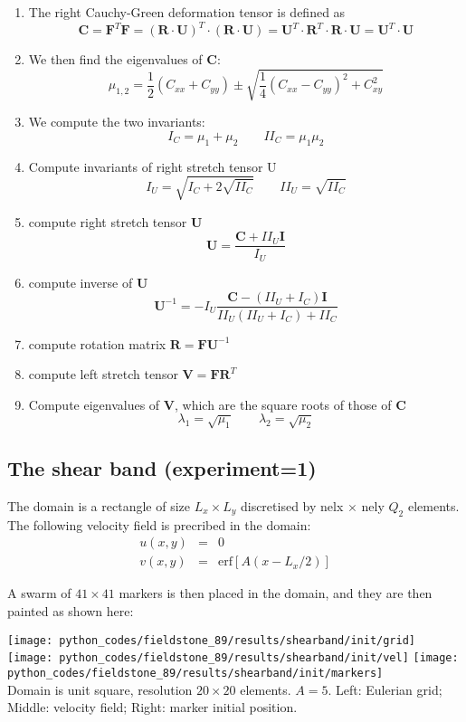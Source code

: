 \begin{enumerate}
\item The right Cauchy-Green deformation tensor is defined as
\[
{\bm C} = {\bm F}^T {\bm F}
= ({\bm R}\cdot {\bm U})^T \cdot ({\bm R} \cdot {\bm U})
= {\bm U}^T \cdot {\bm R}^T \cdot {\bm R} \cdot {\bm U}
= {\bm U}^T \cdot {\bm U}
\]
\item 
We then find the eigenvalues of ${\bm C}$:
\[
\mu_{1,2} = \frac{1}{2}(C_{xx}+C_{yy}) \pm \sqrt{ \frac{1}{4}(C_{xx}-C_{yy})^2 + C_{xy}^2   }
\]
\item We compute the two invariants:
\[
I_C = \mu_1+\mu_2 \qquad II_C = \mu_1\mu_2 
\]
\item Compute invariants of right stretch tensor U
\[
I_U=\sqrt{I_C+2\sqrt{II_C}}
\qquad
II_U=\sqrt{II_C}
\]
\item compute right stretch tensor ${\bm U}$
\[
{\bm U} = \frac{{\bm C}+ II_U {\bm I}}{I_U}
\]
\item compute inverse of ${\bm U}$
\[
{\bm U}^{-1} = - I_U \frac{{\bm C}- (II_U+I_C){\bm I}}{II_U(II_U+I_C)+II_C}
\]
\item compute rotation matrix ${\bm R}={\bm F}{\bm U}^{-1}$

\item compute left stretch tensor ${\bm V}={\bm F}{\bm R}^T$

\item Compute eigenvalues of ${\bm V}$, which are the square roots of those of ${\bm C}$
\[
\lambda_1 = \sqrt{\mu_1}
\qquad
\lambda_2 = \sqrt{\mu_2}
\]

\end{enumerate}










\newpage
\subsection*{The shear band (experiment=1)}

The domain is a rectangle of size $L_x\times L_y$ discretised by nelx $\times$ nely $Q_2$ elements.
The following velocity field is precribed in the domain:
\begin{eqnarray}
u(x,y)&=&0 \\
v(x,y)&=&\text{erf} [A(x-L_x/2)]
\end{eqnarray}

A swarm of $41\times41$ markers is then placed in the domain, 
and they are then painted as shown here:
\begin{center}
\texttt{[image: python\_codes/fieldstone\_89/results/shearband/init/grid]}
\texttt{[image: python\_codes/fieldstone\_89/results/shearband/init/vel]}
\texttt{[image: python\_codes/fieldstone\_89/results/shearband/init/markers]}\\
{\captionfont Domain is unit square, resolution $20\times20$ elements. $A=5$. 
Left: Eulerian grid; Middle: velocity field; Right: marker initial position.}
\end{center}

